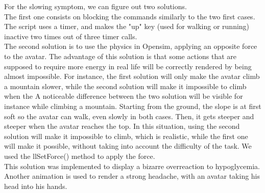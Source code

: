 For the slowing symptom, we can figure out two solutions.\\ The first one consists on blocking the commands similarly to the two first cases. The script uses a timer, and makes the "up" key (used for walking or running) inactive two times out of three timer calls.\\
The second solution is to use the physics in Opensim, applying an opposite force to the avatar. 
The advantage of this solution is that some actions that are supposed to require more energy in real life will be correctly rendered by being almost impossible. 
For instance, the first solution will only make the avatar climb a mountain slower, while the second solution will make it impossible to climb when the 
A noticeable difference between the two solution will be visible for instance while climbing a mountain. 
Starting from the ground, the slope is at first soft so the avatar can walk, even slowly in both cases. Then, it gets steeper and steeper when the avatar reaches the top. 
In this situation, using the second solution will make it impossible to climb, which is realistic, while the first one will make it possible, without taking into account the difficulty of the task. We used the llSetForce() method to apply the force.\\

This solution was implemented to display a bizarre overreaction to hypoglycemia. Another animation is used to render a strong headache, with an avatar taking his head into his hands. 


